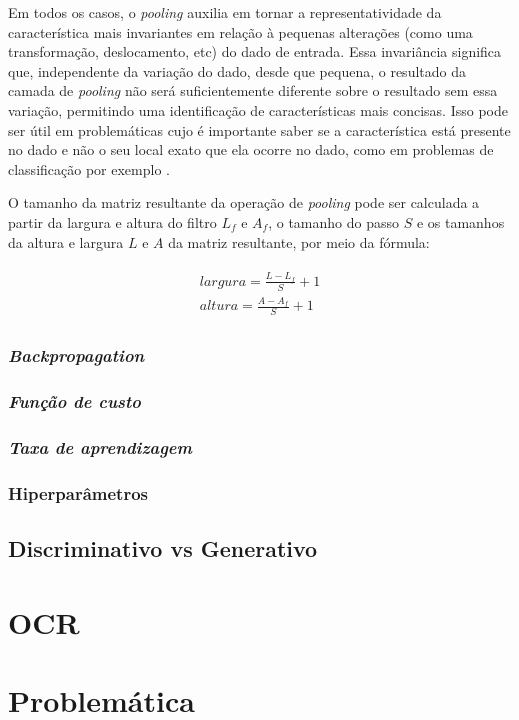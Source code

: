 Em todos os casos, o \textit{pooling} auxilia em tornar a representatividade da característica mais invariantes em relação à pequenas alterações (como uma transformação, deslocamento, etc) do dado de entrada. Essa invariância significa que, independente da variação do dado, desde que pequena, o resultado da camada de \textit{pooling} não será suficientemente diferente sobre o resultado sem essa variação, permitindo uma identificação de características mais concisas. Isso pode ser útil em problemáticas cujo é importante saber se a característica está presente no dado e não o seu local exato que ela ocorre no dado, como em problemas de classificação por exemplo \cite{goodfellow-et-al-2016}.

O tamanho da matriz resultante da operação de \textit{pooling} pode ser calculada a partir da largura e altura do filtro \(L_f\) e \(A_f\), o tamanho do passo \(S\) e os tamanhos da altura e largura \(L\) e \(A\) da matriz resultante, por meio da fórmula:

\begin{gather}
  \begin{split}
    largura = \frac{L - L_f}{S}  + 1 \\
    altura =  \frac{A - A_f}{S} + 1
  \end{split}
  \label{math:size-after-pooling}
\end{gather}


\subsubsection{\textit{Backpropagation}} \label{sssec:backpropagation}

\subsubsection{\textit{Função de custo}} \label{sssec:cost-function}

\subsubsection{\textit{Taxa de aprendizagem}} \label{sssec:learning-rate}

\subsubsection{Hiperparâmetros} \label{sssec:hiperparameters}


\subsection{Discriminativo vs Generativo}

\section{OCR}

\section{Problemática}